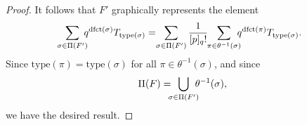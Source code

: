 \documentclass[10pt,a4paper]{amsart}
\newcommand{\dfct}{\mathrm{dfct}}
\newcommand{\nTksp}{\negthickspace\negthickspace}
\newcommand{\ntksp}{\negthickspace}
\newcommand{\sn}{\mathfrak{S}_n}
\newcommand{\type}{\mathrm{type}}
\begin{document}
\begin{proof}
It follows that
$F'$ graphically represents the element
    \begin{equation}\label{eq:qfactsum}
        \nTksp\sum_{\sigma \in \Pi(F')}\nTksp q^{\dfct(\sigma)}T_{\type(\sigma)}
        = \ntksp \sum_{\sigma \in \Pi(F')} 
        \frac 1{[p]_q!}
        \ntksp \sum_{\pi \in \theta^{-1}(\sigma)} \nTksp q^{\dfct(\pi)} T_{\type(\sigma)}.
        \end{equation}
        Since  $\type(\pi) = \type(\sigma)$
        for all $\pi \in \theta^{-1}(\sigma)$, and since
       \begin{equation*}
            \Pi(F) = \nTksp \bigcup_{\sigma \in \Pi(F')}\nTksp \theta^{-1}(\sigma),
        \end{equation*}
        we have the desired result.
%                
\end{proof}
\end{document}
